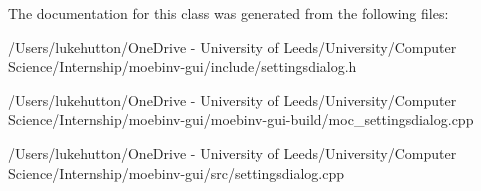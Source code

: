 The documentation for this class was generated from the following files\+:\begin{DoxyCompactItemize}
\item 
/\+Users/lukehutton/\+One\+Drive -\/ University of Leeds/\+University/\+Computer Science/\+Internship/moebinv-\/gui/include/settingsdialog.\+h\item 
/\+Users/lukehutton/\+One\+Drive -\/ University of Leeds/\+University/\+Computer Science/\+Internship/moebinv-\/gui/moebinv-\/gui-\/build/moc\+\_\+settingsdialog.\+cpp\item 
/\+Users/lukehutton/\+One\+Drive -\/ University of Leeds/\+University/\+Computer Science/\+Internship/moebinv-\/gui/src/settingsdialog.\+cpp\end{DoxyCompactItemize}
